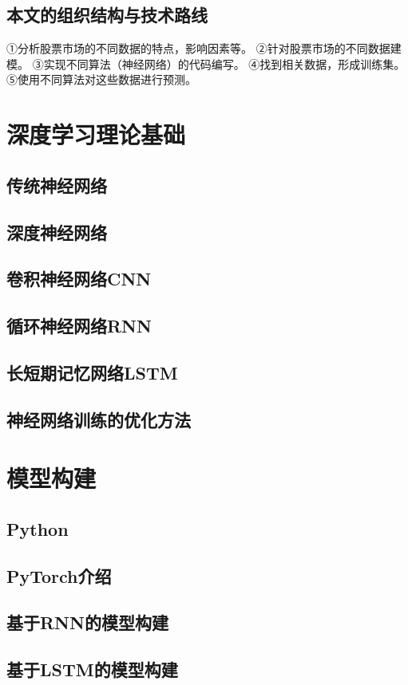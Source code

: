 \documentclass[UTF8]{ctexart}
\begin{document}
\subsection{本文的组织结构与技术路线}
①分析股票市场的不同数据的特点，影响因素等。
②针对股票市场的不同数据建模。
③实现不同算法（神经网络）的代码编写。
④找到相关数据，形成训练集。
⑤使用不同算法对这些数据进行预测。
\section{深度学习理论基础}
\subsection{传统神经网络}
\subsection{深度神经网络}
\subsection{卷积神经网络CNN}
\subsection{循环神经网络RNN}
\subsection{长短期记忆网络LSTM}
\subsection{神经网络训练的优化方法}
\section{模型构建}
\subsection{Python}
\subsection{PyTorch介绍}
\subsection{基于RNN的模型构建}
\subsection{基于LSTM的模型构建}
\end{document}

